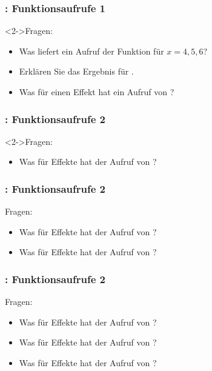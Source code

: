 \begin{fframe}
    \frametitle{\currentfsheading : Funktionsaufrufe 1}
    \begin{block}<2->{Fragen:}
        \begin{itemize}
            \item Was liefert ein Aufruf der Funktion  für $x=4,5,6$?
            \item Erklären Sie das Ergebnis für .
            \item Was für einen Effekt hat ein Aufruf von ?
        \end{itemize}
    \end{block}
\end{fframe}

\begin{fframe}
    \frametitle{\currentfsheading : Funktionsaufrufe 2}
    \begin{block}<2->{Fragen:}
        \begin{itemize}
            \item Was für Effekte hat der Aufruf von ?
        \end{itemize}
    \end{block}
\end{fframe}
\begin{fframe}
    \frametitle{\currentfsheading : Funktionsaufrufe 2}
    \begin{block}{Fragen:}
        \begin{itemize}
            \item Was für Effekte hat der Aufruf von ?
            \item Was für Effekte hat der Aufruf von ?
        \end{itemize}
    \end{block}
\end{fframe}
\begin{fframe}
    \frametitle{\currentfsheading : Funktionsaufrufe 2}
    \begin{block}{Fragen:}
        \begin{itemize}
            \item Was für Effekte hat der Aufruf von ?
            \item Was für Effekte hat der Aufruf von ?
            \item Was für Effekte hat der Aufruf von ?
        \end{itemize}
    \end{block}
\end{fframe}

